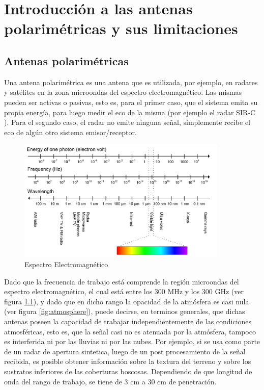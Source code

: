 
\chapter{Introducción a las antenas polarimétricas y sus limitaciones} %
\label{ch:phasedArray}

\section{Antenas polarimétricas}

Una antena polarimétrica es una antena que es utilizada, por ejemplo, en radares y satélites en la zona microondas del espectro
electromagnético. Las mismas pueden ser activas o pasivas, esto es, para el primer caso, que el sistema emita su propia energía,
para luego medir el eco de la misma (por ejemplo el radar SIR-C \cite{Curlander1991}). Para el segundo caso, el radar no emite
ninguna señal, simplemente recibe el eco de algún otro sistema emisor/receptor.

\begin{figure}[H]
 \centering
 \includegraphics[width=10cm]{gfx/electromagneticSpectrum.png}
 \caption{Espectro Electromagnético \cite{electromagneticField}}
 \label{fig:spectrum}
\end{figure}


Dado que la frecuencia de trabajo está comprende la región microondas del espectro electromagnético, el cual está entre los
300 MHz y los 300 GHz (ver figura \ref{fig:spectrum}), y dado que en dicho rango la opacidad de la atmósfera es casi nula
(ver figura \ref{fig:atmosphere}), puede decirse, en terminos generales, que dichas antenas poseen la capacidad de trabajar
independientemente de las condiciones atmosféricas, esto es, que la señal casi no es atenuada por la atmósfera, tampoco es
interferida ni por las lluvias ni por las nubes. Por ejemplo, si se usa como parte de un radar de apertura sintetica, luego de un
post procesamiento de la señal recibida, es posible obtener información sobre la textura del terreno y sobre los sustratos
inferiores de las coberturas boscosas. Dependiendo de que longitud de onda del rango de trabajo, se tiene de 3 cm a 30 cm de
penetración.

